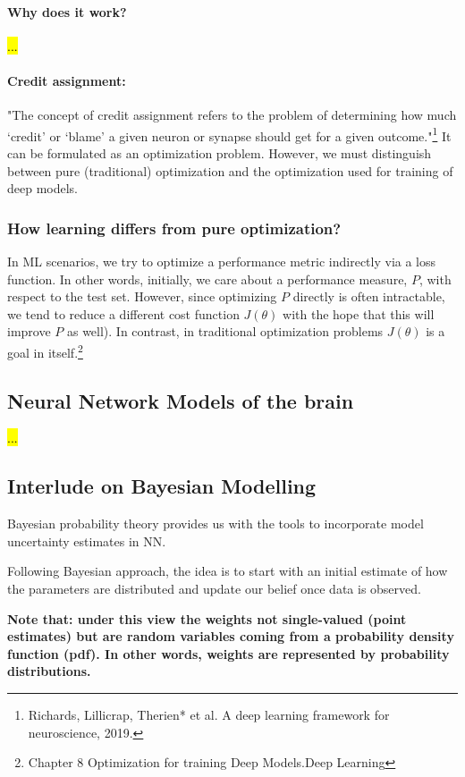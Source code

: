 \documentclass[main]{subfiles}
\begin{document}
\paragraph{Why does it work?}
\hl{...}
\paragraph{Credit assignment:} "The concept of credit assignment refers to the problem of determining how much ‘credit’ or ‘blame’ a given neuron or synapse should get for a given outcome."\footnote{Richards, Lillicrap, Therien* et al. A deep learning framework for neuroscience, 2019.}
\noindent It can be formulated as an optimization problem. However, we must distinguish between pure (traditional) optimization and the optimization used for training of deep models.

\subsubsection{How learning differs from pure optimization?}
In ML scenarios, we try to optimize a performance metric indirectly via a loss function. In other words, initially, we care about a performance measure, $P$, with respect to the test set. However, since optimizing $P$ directly is often intractable, we tend to reduce a different cost function $J(\theta)$ with the hope that this will improve $P$ as well). In contrast, in traditional optimization problems $J(\theta)$ is a goal in itself.\footnote{Chapter 8 Optimization for training Deep Models.Deep Learning}
    

\subsection{Neural Network Models of the brain}
\hl{...}

\subsection{Interlude on Bayesian Modelling}
Bayesian probability theory provides us with the tools to incorporate model uncertainty estimates in NN.
   
\noindent Following Bayesian approach, the idea is to start with an initial estimate of how the parameters are distributed and update our belief once data is observed. 

\noindent
\textbf{Note that: under this view the weights not single-valued (point estimates) but are random variables coming from a probability density function (pdf). In other words, weights are represented by probability distributions.}
\end{document}
